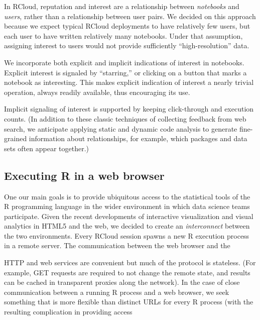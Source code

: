 In RCloud, reputation and interest are a relationship between
\emph{notebooks} and \emph{users}, rather than a relationship between
user pairs. We decided on this approach because we expect typical
RCloud deployments to have relatively few users, but each user to have
written relatively many notebooks. Under that assumption, assigning
interest to users would not provide sufficiently ``high-resolution'' data.

We incorporate both explicit and implicit indications of interest
in notebooks. Explicit interest is signaled by ``starring,'' or
clicking on a button that marks a notebook as interesting.
This makes explicit indication of interest a nearly trivial operation,
always readily available, thus encouraging its use.

Implicit signaling of interest is supported by keeping click-through
\cite{Joachims:2005:AIC} and execution counts. (In addition to these
classic techniques of collecting feedback from web search, we anticipate
applying static and dynamic code analysis to generate fine-grained
information about relationships, for example, which packages and data
sets often appear together.)

\subsection{Executing R in a web browser}

One our main goals is to provide ubiquitous access to the statistical
tools of the R programming language in the wider environment in which data
science teams participate.
%
Given the recent developments of interactive visualization and visual
analytics in HTML5 and the web, we decided to create an
\emph{interconnect} between the two environments.
%
Every RCloud session spawns a new R execution process in a remote
server. The communication between the web browser and the 


HTTP and web services are convenient but much of the protocol is
stateless. (For example, GET requests are required to not change the
remote state, and results can be cached in transparent proxies along
the network). In the case of close communication between a running
R process and a web browser, we seek something that is more flexible
than distinct URLs for every R process (with the resulting
complication in providing access 


